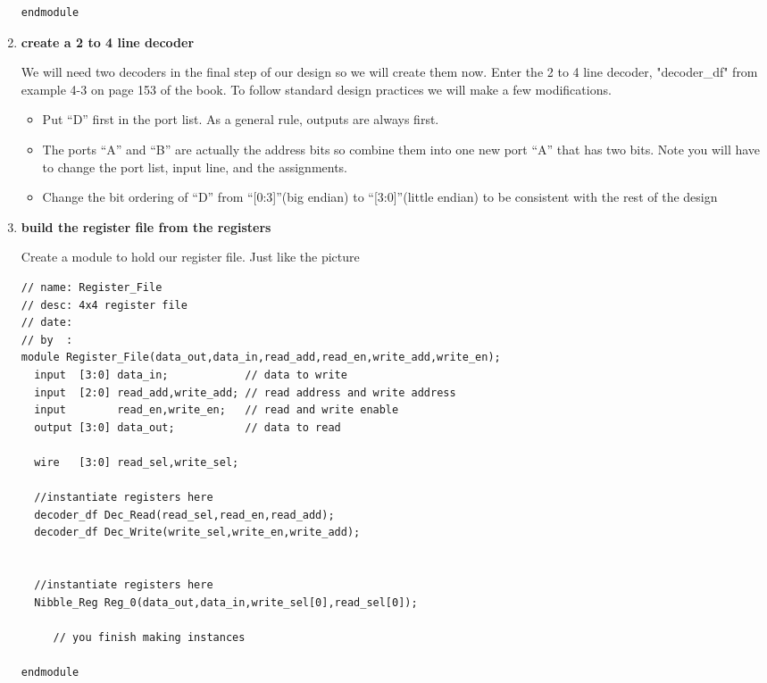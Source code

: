 \begin{enumerate}
\begin{verbatim}
endmodule

\end{verbatim}

\item \textbf{create a 2 to 4 line decoder}

We will need two decoders in the final step of our design so we will create them now.  Enter the 2 to 4 line decoder, "decoder\_df" from example 4-3 on page 153 of the book.  To follow standard design practices we will make a few modifications.
\begin{itemize}
    \item Put ``D'' first in the port list.  As a general rule, outputs are always first.
    \item The ports ``A'' and ``B'' are actually the address bits so combine them into one new port ``A'' that has two bits.  Note you will have to change the port list, input line, and the assignments.
    \item Change the bit ordering of ``D'' from ``[0:3]''(big endian) to ``[3:0]''(little endian) to be consistent with the rest of the design
\end{itemize}

\item \textbf{build the register file from the registers}

\RegisterFile

  Create a module to hold our register file.  Just like the picture

\begin{verbatim}
// name: Register_File
// desc: 4x4 register file
// date:
// by  :
module Register_File(data_out,data_in,read_add,read_en,write_add,write_en);
  input  [3:0] data_in;            // data to write
  input  [2:0] read_add,write_add; // read address and write address
  input        read_en,write_en;   // read and write enable
  output [3:0] data_out;           // data to read

  wire   [3:0] read_sel,write_sel;

  //instantiate registers here
  decoder_df Dec_Read(read_sel,read_en,read_add);
  decoder_df Dec_Write(write_sel,write_en,write_add);


  //instantiate registers here
  Nibble_Reg Reg_0(data_out,data_in,write_sel[0],read_sel[0]);

     // you finish making instances

endmodule

\end{verbatim}


\end{enumerate}


